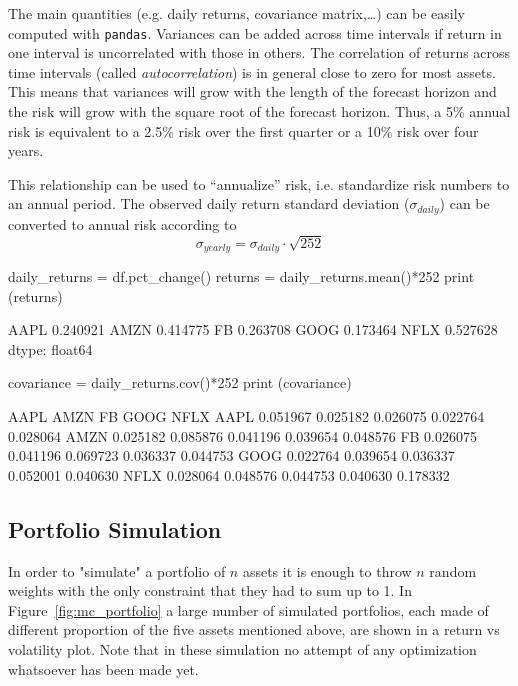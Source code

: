 The main quantities (e.g. daily returns, covariance matrix,\ldots) can be easily computed with \texttt{pandas}.
Variances can be added across time intervals if return in one interval is uncorrelated with those in others. The correlation of returns across time intervals (called \emph{autocorrelation}) is in general close to zero for most assets. This means that variances will grow with the length of the forecast horizon and the risk will grow with the square root of the forecast horizon. 
Thus, a 5\% annual risk is equivalent to a 2.5\% risk over the first quarter or a 10\% risk over four years. 

This relationship can be used to “annualize” risk, i.e. standardize risk numbers to an annual period. The observed daily return standard deviation ($\sigma_{daily}$) can be converted to annual risk according to
\begin{equation}
\sigma_{yearly} = \sigma_{daily}\cdot\sqrt{252}
\end{equation}

\begin{ipython}
daily_returns = df.pct_change()
returns = daily_returns.mean()*252
print (returns)
\end{ipython}
\begin{ioutput}
AAPL    0.240921
AMZN    0.414775
FB      0.263708
GOOG    0.173464
NFLX    0.527628
dtype: float64
\end{ioutput}

\begin{ipython}
covariance = daily_returns.cov()*252
print (covariance)
\end{ipython}
\begin{ioutput}
          AAPL      AMZN        FB      GOOG      NFLX
AAPL  0.051967  0.025182  0.026075  0.022764  0.028064
AMZN  0.025182  0.085876  0.041196  0.039654  0.048576
FB    0.026075  0.041196  0.069723  0.036337  0.044753
GOOG  0.022764  0.039654  0.036337  0.052001  0.040630
NFLX  0.028064  0.048576  0.044753  0.040630  0.178332
\end{ioutput}
    
\subsection{Portfolio Simulation}
In order to "simulate" a portfolio of $n$ assets it is enough to throw $n$ random weights with the only constraint that they had to sum up to 1. 
In Figure~\ref{fig:mc_portfolio} a large number of simulated portfolios, each made of different proportion of the five assets mentioned above, are shown in a return vs volatility plot. 
Note that in these simulation no attempt of any optimization whatsoever has been made yet.

